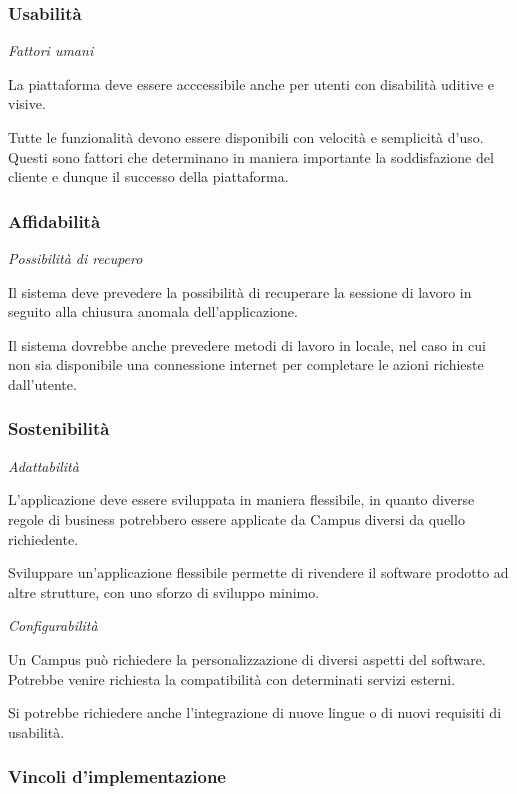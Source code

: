 \subsubsection{Usabilità}

\textit{Fattori umani}

La piattaforma deve essere acccessibile anche per utenti con disabilità uditive e visive.

Tutte le funzionalità devono essere disponibili con velocità e semplicità d'uso. Questi sono fattori che determinano in maniera importante la soddisfazione del cliente e dunque il successo della piattaforma.

\subsubsection{Affidabilità}

\textit{Possibilità di recupero}

Il sistema deve prevedere la possibilità di recuperare la sessione di lavoro in seguito alla chiusura anomala dell'applicazione.

Il sistema dovrebbe anche prevedere metodi di lavoro in locale, nel caso in cui non sia disponibile una connessione internet per completare le azioni richieste dall'utente.

\subsubsection{Sostenibilità}

\textit{Adattabilità}

L'applicazione deve essere sviluppata in maniera flessibile, in quanto diverse regole di business potrebbero essere applicate da Campus diversi da quello richiedente. 

Sviluppare un'applicazione flessibile permette di rivendere il software prodotto ad altre strutture, con uno sforzo di sviluppo minimo. 

\textit{Configurabilità}

Un Campus può richiedere la personalizzazione di diversi aspetti del software. Potrebbe venire richiesta la compatibilità con determinati servizi esterni.

Si potrebbe richiedere anche l'integrazione di nuove lingue o di nuovi requisiti di usabilità.

\subsubsection{Vincoli d'implementazione}

